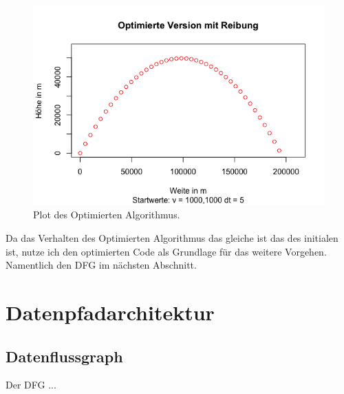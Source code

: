\documentclass{artilcle}
\begin{document}
    \begin{figure}[!htbp]
        \includegraphics[width=\textwidth]{../Ballistiken/PlotExports/Optimiert.png}
        \caption{Plot des Optimierten Algorithmus.}
        \label{Ortsplot initial}
    \end{figure}

    Da das Verhalten des Optimierten Algorithmus das gleiche ist das des initialen ist, nutze ich den
    optimierten Code als Grundlage für das weitere Vorgehen. Namentlich den DFG im nächsten Abschnitt.


    \section{Datenpfadarchitektur}

    \subsection{Datenflussgraph}

    Der DFG ...

\end{document}
